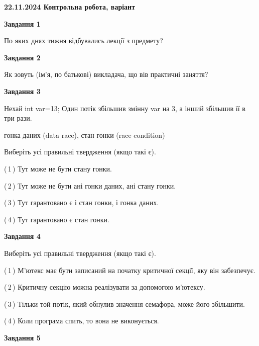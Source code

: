 \documentclass[12pt, ukrainian]{article}
\begin{document}
\begin {large}

\textbf{22.11.2024 Контрольна робота, варіант  }\par


{

\begin{center}
\textbf{Завдання 1}
\end{center}

По яких днях тижня відбувались лекції з предмету?


\begin{center}
\textbf{Завдання 2}
\end{center}

Як зовуть (ім'я, по батькові) викладача, що вів практичні заняття?


\begin{center}
\textbf{Завдання 3}
\end{center}

Нехай int var=13; Один потік збільшив змінну var на 3, а інший збільшив її в три рази.

гонка даних (data race), стан гонки (race condition)

Виберіть усі правильні твердження (якщо такі є).\par
\vspace{2mm}
(\,1\,) Тут може не бути стану гонки.%

(\,2\,) Тут може не бути ані гонки даних, ані стану гонки.%

(\,3\,) Тут гарантовано є і стан гонки, і гонка даних.%

(\,4\,) Тут гарантовано є стан гонки.%


\begin{center}
\textbf{Завдання 4}
\end{center}

Виберіть усі правильні твердження (якщо такі є).\par
\vspace{2mm}

(\,1\,) М’ютекс має бути записаний на початку критичної секції, яку він забезпечує.%

(\,2\,) Критичну секцію можна реалізувати за допомогою м’ютексу.%

(\,3\,) Тільки той потік, який обнулив значення семафора, може його збільшити.%

(\,4\,) Коли програма спить, то вона не виконується.%


\begin{center}
\textbf{Завдання 5}
\end{center}

}
\end{large}
\end{document}
